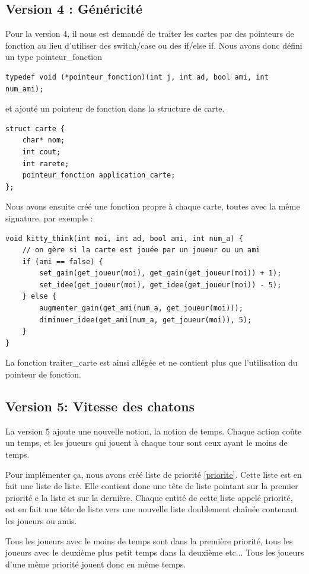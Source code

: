 \documentclass[10pt,a4paper]{article}
\begin{document}
\subsection{Version 4 : Généricité}
Pour la version 4, il nous est demandé de traiter les cartes par des pointeurs de fonction au lieu d'utiliser des switch/case ou des if/else if. 
Nous avons donc défini un type pointeur\_fonction 
\begin{verbatim}
typedef void (*pointeur_fonction)(int j, int ad, bool ami, int num_ami);
\end{verbatim}
et ajouté un pointeur de fonction dans la structure de carte. 
\begin{verbatim}
struct carte {
    char* nom;
    int cout;
    int rarete;
    pointeur_fonction application_carte;
};
\end{verbatim}

Nous avons ensuite créé une fonction propre à chaque carte, toutes avec la même signature, par exemple :

\begin{verbatim}
void kitty_think(int moi, int ad, bool ami, int num_a) {
    // on gère si la carte est jouée par un joueur ou un ami 
    if (ami == false) {
        set_gain(get_joueur(moi), get_gain(get_joueur(moi)) + 1);
        set_idee(get_joueur(moi), get_idee(get_joueur(moi)) - 5);
    } else {
        augmenter_gain(get_ami(num_a, get_joueur(moi)));
        diminuer_idee(get_ami(num_a, get_joueur(moi)), 5);
    }
}
\end{verbatim}

La fonction traiter\_carte est ainsi allégée et ne contient plus que l'utilisation du pointeur de fonction. 

\subsection{Version 5: Vitesse des chatons}
La version 5 ajoute une nouvelle notion, la notion de temps. Chaque action coûte un temps, et les joueurs qui jouent à chaque tour sont ceux ayant le moins de temps. 


Pour implémenter ça, nous avons créé liste de priorité \ref{priorite}. Cette liste est en fait une liste de liste.
Elle contient donc une tête de liste pointant sur la premier priorité e la liste et sur la dernière. Chaque entité de cette liste appelé priorité, est en fait une tête de liste vers une nouvelle liste doublement chaînée contenant les joueurs ou amis. 


Tous les joueurs avec le moins de temps sont dans la première priorité, tous les joueurs avec le deuxième plus petit temps dans la deuxième etc...
Tous les joueurs d'une même priorité jouent donc en même temps.
\end{document}
